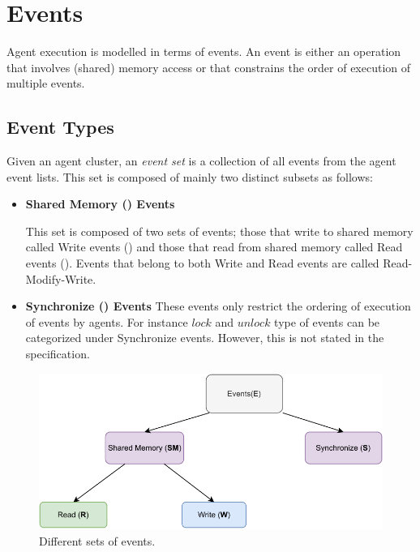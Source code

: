 \section{Events}
        
    Agent execution is modelled in terms of events. An event is either an operation that involves (shared) memory access or that constrains the order of execution of multiple events.

    \subsection{Event Types}
    
        Given an agent cluster, an \textit{event set}  is a collection of all events from the agent event lists. This set is composed of mainly two distinct subsets as follows: 

        \begin{itemize}
            \item \textbf{Shared Memory () Events}
                
                This set is composed of two sets of events; those that write to shared memory called Write events () and those that read from shared memory called Read events (). Events that belong to both Write and Read events are called Read-Modify-Write. 
            
            \item \textbf{Synchronize () Events} 
                These events only restrict the ordering of execution of events by agents. For instance $lock$ and $unlock$ type of events can be categorized under Synchronize events. However, this is not stated in the specification\footnotemark. 
    
        \end{itemize}
        
        \begin{figure}[H]
            \centering 
            \includegraphics[scale=0.7]{4.ECMAScriptMemoryModel/EventTypes.pdf}
            \caption{Different sets of events.}
        \end{figure}

